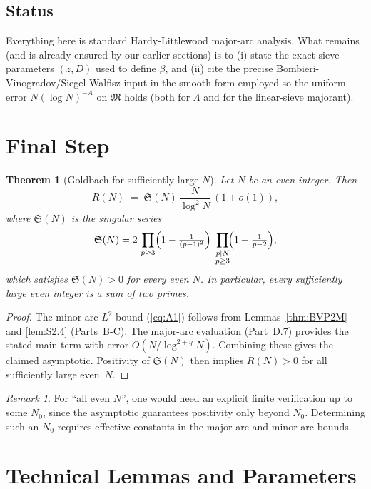 \documentclass[11pt]{article}
\def\eqref#1{(\ref{#1})}%
\renewcommand{\thepart}{\Alph{part}}
\newtheorem{theorem}[lemma]{Theorem}
\theoremstyle{definition}
\theoremstyle{remark}
\newtheorem{remark}[lemma]{Remark}
\numberwithin{equation}{part}
\renewcommand{\thesection}{\thepart.\arabic{section}}
\begin{document}
\subsection{Status}
Everything here is standard Hardy-Littlewood major-arc analysis.  What remains (and is already ensured by our earlier sections) is to (i) state the exact sieve parameters $(z,D)$ used to define $\beta$, and (ii) cite the precise Bombieri-Vinogradov/Siegel-Walfisz input in the smooth form employed so the uniform error $N(\log N)^{-A}$ on $\mathfrak M$ holds (both for $\Lambda$ and for the linear-sieve majorant).

\section{Final Step}

\begin{theorem}[Goldbach for sufficiently large $N$]\label{thm:goldbach}
	Let $N$ be an even integer. Then
	\[
		R(N)\;=\;\mathfrak S(N)\,\frac{N}{\log^2 N}\,(1+o(1)),
	\]
	where $\mathfrak S(N)$ is the singular series
	\[
		\mathfrak S(N)
		=2\,\prod_{p\ge 3}\Bigl(1-\tfrac{1}{(p-1)^2}\Bigr)
		\;\prod_{\substack{p\mid N\\ p\ge 3}}\!\Bigl(1+\tfrac{1}{p-2}\Bigr),
	\]
	which satisfies $\mathfrak S(N)>0$ for every even $N$.
	In particular, every sufficiently large even integer is a sum of two primes.
\end{theorem}

\begin{proof}
	The minor-arc $L^2$ bound \eqref{eq:A1} follows from
	Lemmas~\ref{thm:BVP2M} and \ref{lem:S2.4} (Parts~B-C).
	The major-arc evaluation (Part~D.7) provides the stated main term with error $O(N/\log^{2+\eta}N)$.
	Combining these gives the claimed asymptotic.
	Positivity of $\mathfrak S(N)$ then implies $R(N)>0$ for all sufficiently large even~$N$.
\end{proof}

\begin{remark}
	For “all even $N$”, one would need an explicit finite verification up to some $N_0$, since the asymptotic guarantees positivity only beyond $N_0$. Determining such an $N_0$ requires effective constants in the major-arc and minor-arc bounds.
\end{remark}

\appendix
\renewcommand{\thesection}{Appendix~\Roman{section}}
\section{Technical Lemmas and Parameters}
\end{document}
